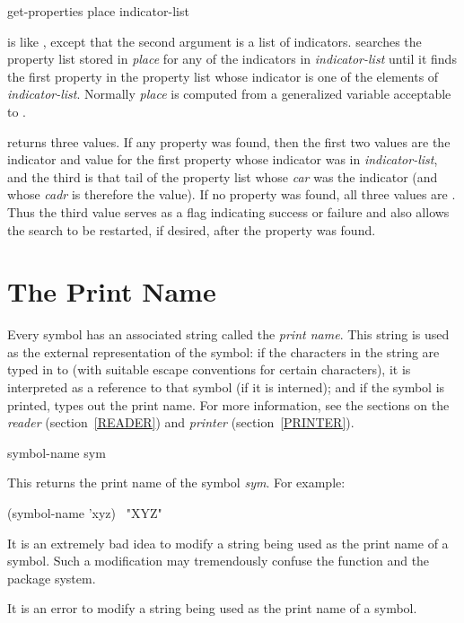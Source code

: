 \begin{defun}[Function]
get-properties place indicator-list

 is like , except that the second
argument is a list of indicators.   searches the
property list stored in \emph{place} for any of the indicators in
\emph{indicator-list} until it finds the first property
in the property list whose indicator is one of
the elements of \emph{indicator-list}.  Normally \emph{place} is computed from
a generalized variable acceptable to .

 returns three values.
If any property was found, then
the first two values are the indicator
and value for the first property whose indicator was in \emph{indicator-list},
and the third is that tail of the property list whose \emph{car}
was the indicator (and whose \emph{cadr} is therefore the value).
If no property was found, all three values are {\nil}.
Thus the third value serves as a flag indicating success or failure
and also allows the search to be restarted, if desired, after the property
was found.
\end{defun}

\section{The Print Name}

Every symbol has an associated string called the \emph{print name}.
This string is used as the external representation of the symbol:
if the characters in the string are typed in to 
(with suitable escape conventions for certain characters),
it is interpreted as a reference to that symbol
(if it is interned); and if the symbol is printed,  types out the
print name.
For more information, see the sections on the \emph{reader}
(section~\ref{READER})
and \emph{printer} (section~\ref{PRINTER}).

\begin{defun}[Function]
symbol-name sym

This returns the print name of the symbol \emph{sym}.
For example:
\begin{lisp}
(symbol-name 'xyz) \EV\ "XYZ"
\end{lisp}
It is an extremely bad idea to modify a string being used as the print name of
a symbol.  Such a modification may tremendously confuse
the function  and the package system.

It is an error to modify a string being used
as the print name of a symbol.
\end{defun}

